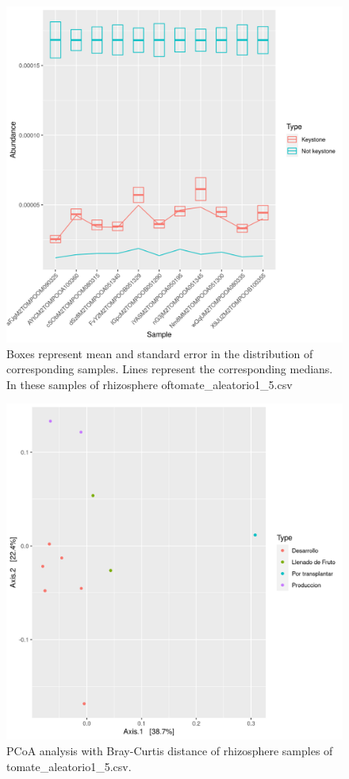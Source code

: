 \begin{figure}
 \centering
 \includegraphics[scale = 0.75]{mean_median_key_vs_not_key_tomate_aleatorio1_5.csv.png}
\caption{Boxes represent mean and standard error in the distribution of corresponding samples. Lines represent the corresponding medians. In these samples of rhizosphere oftomate_aleatorio1_5.csv}
\label{mean_median_tomate_aleatorio1_5.csv}
\end{figure}
\begin{figure}
   \centering
   \includegraphics[scale = 0.7]{pcoa_muestras_tomate_aleatorio1_5.csv.png}
 \caption{PCoA analysis with Bray-Curtis distance of rhizosphere samples of tomate_aleatorio1_5.csv.}
 \label{fig:tomate_aleatorio1_5.csv_pcoa}
\end{figure}

